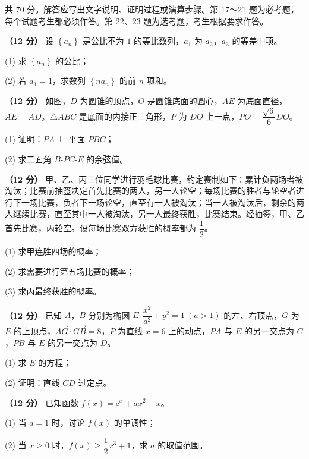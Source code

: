 \begin{gktip}
共 70 分。解答应写出文字说明、证明过程或演算步骤。第 17～21 题为必考题，每个试题考生都必须作答。第 22、23 题为选考题，考生根据要求作答。
\end{gktip}


\begin{question}
\textbf{（12 分）} 设 $\left\{a_n\right\}$ 是公比不为 $1$ 的等比数列，$a_1$ 为 $a_2$，$a_3$ 的等差中项。

  (1) 求 $\left\{a_n\right\}$ 的公比；

  (2) 若 $a_1=1$，求数列 $\left\{na_n\right\}$ 的前 $n$ 项和。

\Needspace{0.4\textheight}
\end{question}
\begin{question}
\textbf{（12 分）} 如图，$D$ 为圆锥的顶点，$O$ 是圆锥底面的圆心，$AE$ 为底面直径，$AE=AD$。$\triangle ABC$ 是底面的内接正三角形，$P$ 为 $DO$ 上一点，$PO=\dfrac{\sqrt6}6DO$。
\nopagebreak[4]
\begin{center}\end{center}
\nopagebreak[4]
  (1) 证明：$PA\perp$ 平面 $PBC$；

  (2) 求二面角 $B\text{-}PC\text{-}E$ 的余弦值。

\end{question}
\begin{question}
\textbf{（12 分）} 甲、乙、丙三位同学进行羽毛球比赛，约定赛制如下：累计负两场者被淘汰；比赛前抽签决定首先比赛的两人，另一人轮空；每场比赛的胜者与轮空者进行下一场比赛，负者下一场轮空，直至有一人被淘汰；当一人被淘汰后，剩余的两人继续比赛，直至其中一人被淘汰，另一人最终获胜，比赛结束。经抽签，甲、乙首先比赛，丙轮空。设每场比赛双方获胜的概率都为 $\dfrac12$。

  (1) 求甲连胜四场的概率；

  (2) 求需要进行第五场比赛的概率；

  (3) 求丙最终获胜的概率。

\end{question}
\begin{question}
\textbf{（12 分）} 已知 $A$，$B$ 分别为椭圆 $E:\dfrac{x^{2}}{a^{2}}+y^{2}=1\ (a>1)$ 的左、右顶点，$G$ 为 $E$ 的上顶点，$\overrightarrow{AG}\cdot\overrightarrow{GB}=8$，$P$ 为直线 $x=6$ 上的动点，$PA$ 与 $E$ 的另一交点为 $C$，$PB$ 与 $E$ 的另一交点为 $D$。

  (1) 求 $E$ 的方程；

  (2) 证明：直线 $CD$ 过定点。

\end{question}
\begin{question}
\textbf{（12 分）} 已知函数 $f(x)=\mathrm e^{x}+ax^{2}-x$。

  (1) 当 $a=1$ 时，讨论 $f(x)$ 的单调性；

  (2) 当 $x\ge0$ 时，$f(x)\ge\dfrac12x^{3}+1$，求 $a$ 的取值范围。

\par\medskip

\end{question}

